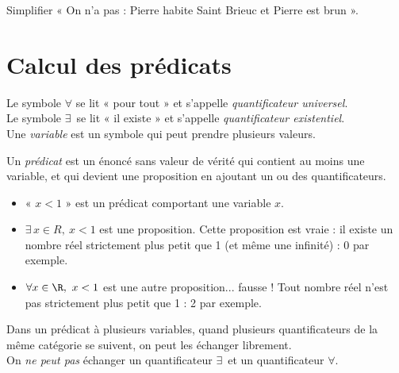 \begin{exercice}[]
	Simplifier « On n'a pas : Pierre habite Saint Brieuc et Pierre est brun ».
\end{exercice}


\section{Calcul des prédicats}

\begin{definition}
	
	Le symbole $\forall$ se lit « pour tout » et s'appelle \textit{quantificateur universel}.\\
	Le symbole $\exists\,$ se lit « il existe » et s'appelle \textit{quantificateur existentiel}.\\
	
	Une \textit{variable} est un symbole qui peut prendre plusieurs valeurs.
	
	Un \textit{prédicat} est un énoncé sans valeur de vérité qui contient au moins une variable, et qui devient une proposition en ajoutant un ou des quantificateurs.
\end{definition}

\begin{exemple}[s]
	\begin{itemize}
		\item 	« $x<1$ » est un prédicat comportant une variable $x$.
		\item 	$\exists\, x\in R,\ x<1$ est une proposition. Cette proposition est vraie : il existe un nombre réel strictement plus petit que 1 (et même une infinité) : 0 par exemple.
		\item 	$\forall x\in\R,\ x<1$ est une autre proposition... fausse ! Tout nombre réel n'est pas strictement plus petit que 1 : 2 par exemple.
	\end{itemize}
\end{exemple}

\begin{propriete}
	Dans un prédicat à plusieurs variables, quand plusieurs quantificateurs de la même catégorie se suivent, on peut les échanger librement.\\
	On \textit{ne peut pas} échanger un quantificateur $\exists\,$ et un quantificateur $\forall$.
\end{propriete}

